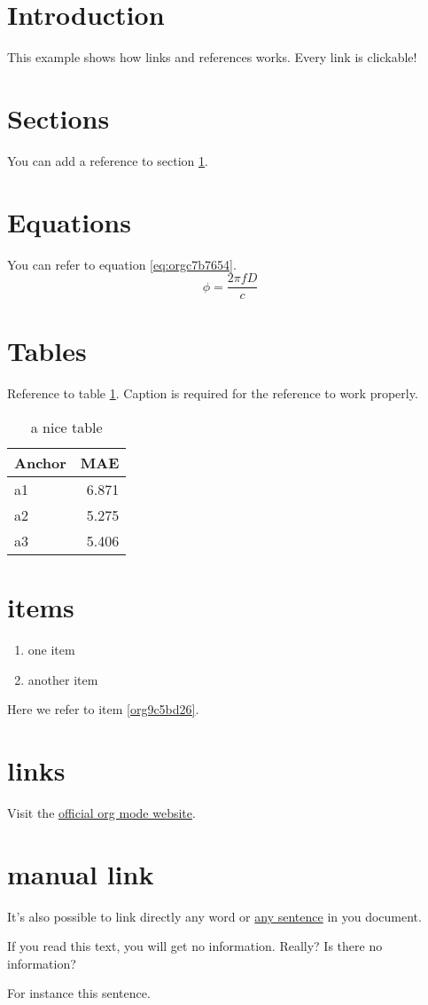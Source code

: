 


\section{Introduction}
\label{sec:org86fb1ec}
This example shows how links and references works.
Every link is clickable!

\section{Sections}
\label{sec:org19754c1}
You can add a reference to section \ref{sec:org86fb1ec}.

\section{Equations}
\label{sec:org3a8fe6f}
You can refer to equation \ref{eq:orgc7b7654}.
\begin{equation}
\label{eq:orgc7b7654}
\phi = \frac{2\pi fD}{c}
\end{equation}

\section{Tables}
\label{sec:org5e13892}
Reference to table \ref{tab:org459c821}.
Caption is required for the reference to work properly.

\begin{table}[htbp]
\caption{\label{tab:org459c821}
a nice table}
\centering
\begin{tabular}{lr}
Anchor & MAE\\
\hline
a1 & 6.871\\
a2 & 5.275\\
a3 & 5.406\\
\end{tabular}
\end{table}

\section{items}
\label{sec:org261cab3}
\begin{enumerate}
\item one item
\item \label{org9c5bd26}another item
\end{enumerate}
Here we refer to item \ref{org9c5bd26}.

\section{links}
\label{sec:orgea25608}
Visit the \href{https://orgmode.org/}{official org mode website}.

\section{manual link}
\label{sec:orgaed802a}
It's also possible to link directly any word
or \hyperlink{thesentence}{any sentence} in you document.

If you read this text, you will get no information.  Really?
Is there no information?

For instance \hypertarget{thesentence}{this sentence}.


